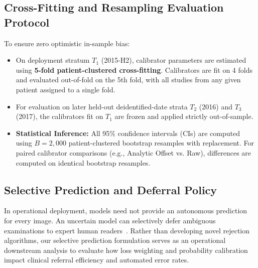 \documentclass[preprint,12pt]{elsarticle}
\begin{document}
\subsection{Cross-Fitting and Resampling Evaluation Protocol}
To ensure zero optimistic in-sample bias:
\begin{itemize}
    \item On deployment stratum $T_1$ (2015-H2), calibrator parameters are estimated using \textbf{5-fold patient-clustered cross-fitting}. Calibrators are fit on 4 folds and evaluated out-of-fold on the 5th fold, with all studies from any given patient assigned to a single fold.
    \item For evaluation on later held-out deidentified-date strata $T_2$ (2016) and $T_3$ (2017), the calibrators fit on $T_1$ are frozen and applied strictly out-of-sample.
    \item \textbf{Statistical Inference:} All 95\% confidence intervals (CIs) are computed using $B = 2,000$ patient-clustered bootstrap resamples with replacement. For paired calibrator comparisons (e.g., Analytic Offset vs. Raw), differences are computed on identical bootstrap resamples.
\end{itemize}

\subsection{Selective Prediction and Deferral Policy}
In operational deployment, models need not provide an autonomous prediction for every image. An uncertain model can selectively defer ambiguous examinations to expert human readers~\cite{geifman2017selective, kompa2021second, aperstein2026knowing}. Rather than developing novel rejection algorithms, our selective prediction formulation serves as an operational downstream analysis to evaluate how loss weighting and probability calibration impact clinical referral efficiency and automated error rates.
\end{document}
